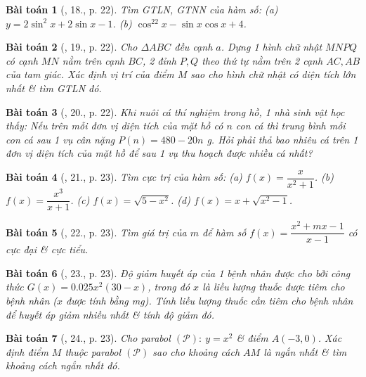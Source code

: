 \documentclass{article}
\newtheorem{baitoan}{Bài toán}
\begin{document}
\begin{baitoan}[\cite{SGK_Toan_12_giai_tich_nang_cao}, 18., p. 22]
	Tìm {\rm GTLN, GTNN} của hàm số: (a) $y = 2\sin^2x + 2\sin x - 1$. (b) $\cos^22x - \sin x\cos x + 4$.
\end{baitoan}

\begin{baitoan}[\cite{SGK_Toan_12_giai_tich_nang_cao}, 19., p. 22]
	Cho $\Delta ABC$ đều cạnh $a$. Dựng 1 hình chữ nhật $MNPQ$ có cạnh $MN$ nằm trên cạnh $BC$, 2 đỉnh $P,Q$ theo thứ tự nằm trên 2 cạnh $AC,AB$ của tam giác. Xác định vị trí của điểm $M$ sao cho hình chữ nhật có diện tích lớn nhất \& tìm {\rm GTLN} đó.
\end{baitoan}

\begin{baitoan}[\cite{SGK_Toan_12_giai_tich_nang_cao}, 20., p. 22]
	Khi nuôi cá thí nghiệm trong hồ, 1 nhà sinh vật học thấy: Nếu trên mỗi đơn vị diện tích của mặt hồ có $n$ con cá thì trung bình mỗi con cá sau 1 vụ cân nặng $P(n) = 480 - 20n$ {\rm g}. Hỏi phải thả bao nhiêu cá trên 1 đơn vị diện tích của mặt hồ để sau 1 vụ thu hoạch được nhiều cá nhất?
\end{baitoan}

\begin{baitoan}[\cite{SGK_Toan_12_giai_tich_nang_cao}, 21., p. 23]
	Tìm cực trị của hàm số: (a) $f(x)  = \dfrac{x}{x^2 + 1}$. (b) $f(x) = \dfrac{x^3}{x + 1}$. (c) $f(x) = \sqrt{5 - x^2}$. (d) $f(x) = x + \sqrt{x^2 - 1}$.
\end{baitoan}

\begin{baitoan}[\cite{SGK_Toan_12_giai_tich_nang_cao}, 22., p. 23]
	Tìm giá trị của $m$ để hàm số $f(x) = \dfrac{x^2 + mx - 1}{x - 1}$ có cực đại \& cực tiểu.
\end{baitoan}

\begin{baitoan}[\cite{SGK_Toan_12_giai_tich_nang_cao}, 23., p. 23]
	Độ giảm huyết áp của 1 bệnh nhân được cho bởi công thức $G(x) = 0.025x^2(30 - x)$, trong đó $x$ là liều lượng thuốc được tiêm cho bệnh nhân ($x$ được tính bằng {\rm mg}). Tính liều lượng thuốc cần tiêm cho bệnh nhân để huyết áp giảm nhiều nhất \& tính độ giảm đó.
\end{baitoan}

\begin{baitoan}[\cite{SGK_Toan_12_giai_tich_nang_cao}, 24., p. 23]
	Cho parabol $(\mathcal{P}):\ y = x^2$ \& điểm $A(-3,0)$. Xác định điểm $M$ thuộc parabol $(\mathcal{P})$ sao cho khoảng cách $AM$ là ngắn nhất \& tìm khoảng cách ngắn nhất đó.
\end{baitoan}
\end{document}
